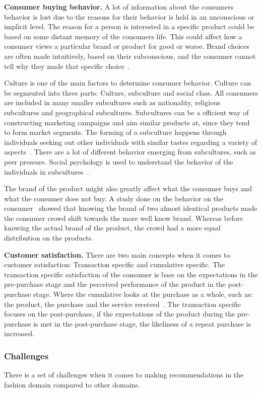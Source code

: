 \textbf{Consumer buying behavior.}
A lot of information about the consumers behavior is lost due to the reasons for their behavior is held in an unconscious or implicit level.
The reason for a person is interested in a specific product could be based on some distant memory of the consumers life.
This could affect how a consumer views a particular brand or product for good or worse.
Brand choices are often made intuitively, based on their subconscious, and the consumer cannot tell why they made that specific choice~\cite{vignali2009fashion}.

Culture is one of the main factors to determine consumer behavior.
Culture can be segmented into three parts: Culture, subculture and social class.
All consumers are included in many smaller subcultures such as nationality, religious subcultures and geographical subcultures.
Subcultures can be a efficient way of constructing marketing campaigns and aim similar products at, since they tend to form market segments.
The forming of a subculture happens through individuals seeking out other individuals with similar tastes regarding a variety of aspects~\cite{vignali2009fashion}.
There are a lot of different behavior emerging from subcultures, such as peer pressure.
Social psychology is used to understand the behavior of the individuals in subcultures~\cite{vignali2009fashion}.

The brand of the product might also greatly affect what the consumer buys and what the consumer does not buy.
A study done on the behavior on the consumer~\cite{deLace2011} showed that knowing the brand of two almost identical products made the consumer crowd shift towards the more well know brand.
Whereas before knowing the actual brand of the product, the crowd had a more equal distribution on the products.

\textbf{Customer satisfaction.}
There are two main concepts when it comes to customer satisfaction:
Transaction specific and cumulative specific.
The transaction specific satisfaction of the consumer is base on the expectations in the pre-purchase stage and the perceived performance of the product in the post-purchase stage.
Where the cumulative looks at the purchase as a whole, such as: the product, the purchase and the service received~\cite{kumari2012}.
The transaction specific focuses on the post-purchase, if the expectations of the product during the pre-purchase is met in the post-purchase stage, the likeliness of a repeat purchase is increased.

\subsubsection{Challenges}
There is a set of challenges when it comes to making recommendations in the fashion domain compared to other domains.

